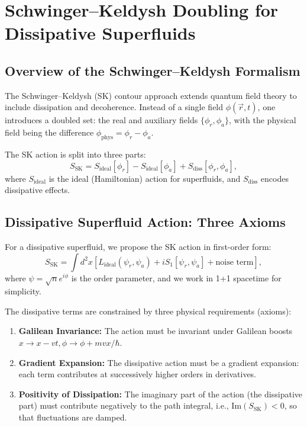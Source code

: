 \documentclass[aps,prl,twocolumn,superscriptaddress,nofootinbib,amsmath,amssymb]{revtex4-2}
\begin{document}
\section{Schwinger--Keldysh Doubling for Dissipative Superfluids}
\label{sec:sk}

\subsection{Overview of the Schwinger--Keldysh Formalism}

The Schwinger--Keldysh (SK) contour approach extends quantum field theory to include dissipation and decoherence. Instead of a single field $\phi(\vec{r}, t)$, one introduces a doubled set: the real and auxiliary fields $\{\phi_r, \phi_a\}$, with the physical field being the difference $\phi_{\text{phys}} = \phi_r - \phi_a$.

The SK action is split into three parts:
\begin{equation}
\label{eq:sk_action_split}
S_{\text{SK}} = S_{\text{ideal}}[\phi_r] - S_{\text{ideal}}[\phi_a] + S_{\text{diss}}[\phi_r, \phi_a],
\end{equation}
where $S_{\text{ideal}}$ is the ideal (Hamiltonian) action for superfluids, and $S_{\text{diss}}$ encodes dissipative effects.

\subsection{Dissipative Superfluid Action: Three Axioms}

For a dissipative superfluid, we propose the SK action in first-order form:
\begin{equation}
\label{eq:sk_first_order}
S_{\text{SK}} = \int d^2 x \left[ L_{\text{ideal}}(\psi_r, \psi_a) + iS_1[\psi_r, \psi_a] + \text{noise term} \right],
\end{equation}
where $\psi = \sqrt{n}e^{i\phi}$ is the order parameter, and we work in 1+1 spacetime for simplicity.

The dissipative terms are constrained by three physical requirements (axioms):
\begin{enumerate}
\item \textbf{Galilean Invariance:} The action must be invariant under Galilean boosts $x \to x - vt, \phi \to \phi + m v x / \hbar$.
\item \textbf{Gradient Expansion:} The dissipative action must be a gradient expansion: each term contributes at successively higher orders in derivatives.
\item \textbf{Positivity of Dissipation:} The imaginary part of the action (the dissipative part) must contribute negatively to the path integral, i.e., $\text{Im}(S_{\text{SK}}) < 0$, so that fluctuations are damped.
\end{enumerate}
\end{document}
